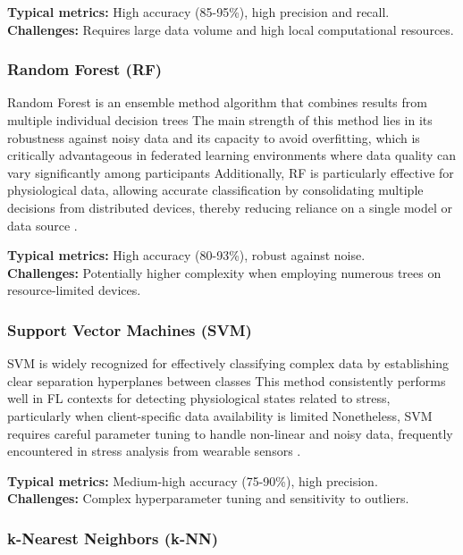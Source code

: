 \documentclass[12pt]{article}
\begin{document}
\textbf{Typical metrics:} High accuracy (85-95\%), high precision and recall.\\
\textbf{Challenges:} Requires large data volume and high local computational resources.

\subsubsection{Random Forest (RF)}

Random Forest is an ensemble method algorithm that combines results from multiple individual decision trees The main strength of this method lies in its robustness against noisy data and its capacity to avoid overfitting, which is critically advantageous in federated learning environments where data quality can vary significantly among participants \cite{tran_duc_luong_b5df10e8} Additionally, RF is particularly effective for physiological data, allowing accurate classification by consolidating multiple decisions from distributed devices, thereby reducing reliance on a single model or data source \cite{adam_sadilek_c59c73f4}.

\textbf{Typical metrics:} High accuracy (80-93\%), robust against noise.\\
\textbf{Challenges:} Potentially higher complexity when employing numerous trees on resource-limited devices.

\subsubsection{Support Vector Machines (SVM)}

SVM is widely recognized for effectively classifying complex data by establishing clear separation hyperplanes between classes This method consistently performs well in FL contexts for detecting physiological states related to stress, particularly when client-specific data availability is limited Nonetheless, SVM requires careful parameter tuning to handle non-linear and noisy data, frequently encountered in stress analysis from wearable sensors \cite{hao_huang_8976046f}.

\textbf{Typical metrics:} Medium-high accuracy (75-90\%), high precision.\\
\textbf{Challenges:} Complex hyperparameter tuning and sensitivity to outliers.

\subsubsection{k-Nearest Neighbors (k-NN)}
\end{document}
